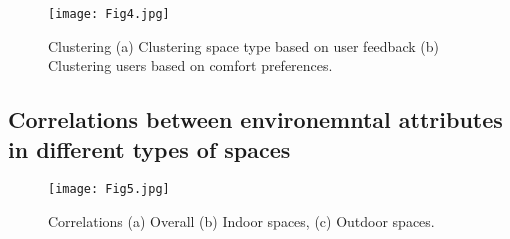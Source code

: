 \begin{figure}
\begin{center}
\texttt{[image: Fig4.jpg]}
\caption{Clustering (a) Clustering space type based on user feedback (b) Clustering users based on comfort preferences.}
\label{fig:Clustering}
\end{center}
\end{figure}




\subsection{Correlations between environemntal attributes in different types of spaces}


\begin{figure}
\begin{center}
\texttt{[image: Fig5.jpg]}
\caption{Correlations (a) Overall (b) Indoor spaces, (c) Outdoor spaces.}
\label{fig:Clustering}
\end{center}
\end{figure}



